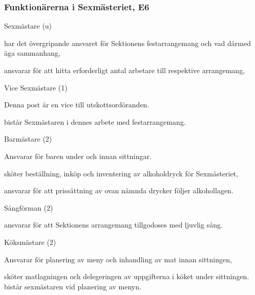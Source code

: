 \documentclass[10pt]{article}
\begin{document}
\subsubsection{Funktionärerna i Sexmästeriet, E6}

\begin{emptylist}
    \item Sexmästare (u)
        \begin{dashlist}
            \item har det övergripande ansvaret för Sektionens
                festarrangemang och vad därmed äga sammanhang,
            \item ansvarar för att hitta erforderligt antal arbetare
                till respektive arrangemang,
        \end{dashlist}
    \item Vice Sexmästare (1)
        \begin{dashlist}
            \item Denna post är en vice till utskottsordöranden.
            \item bistår Sexmästaren i dennes arbete med festarrangemang.
        \end{dashlist}
    \item Barmästare (2)
    \begin{tightdashlist}
        \item Ansvarar för baren under och innan sittningar.
        \item sköter beställning, inköp och inventering av alkoholdryck för Sexmästeriet,
        \item ansvarar för att prissättning av ovan nämnda drycker följer alkohollagen.
    \end{tightdashlist}
    \item Sångförman (2)
        \begin{dashlist}
            \item ansvarar för att Sektionens arrangemang tillgodoses
                med ljuvlig sång.
        \end{dashlist}
    \item Köksmästare (2)
        \begin{dashlist}
        \item Ansvarar för planering av meny och inhandling av mat innan sittningen,
        \item sköter matlagningen och delegeringen av uppgifterna i köket under sittningen. bistår sexmästaren vid planering
        av menyn.
        \end{dashlist}

\end{emptylist}
\end{document}
